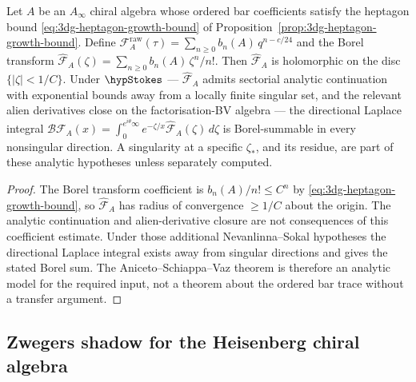 \begin{theorem}
\label{thm:3dg-borel-summability-chain-level}
%
%
Let $A$ be an $A_{\infty}$ chiral algebra whose ordered bar
coefficients satisfy the heptagon bound
\eqref{eq:3dg-heptagon-growth-bound} of
Proposition~\ref{prop:3dg-heptagon-growth-bound}. Define
$\mathcal F^{\mathrm{raw}}_{A}(\tau)
= \sum_{n \ge 0} b_{n}(A)\, q^{n - c/24}$ and the Borel transform
$\widehat{\mathcal F}_{A}(\zeta)
= \sum_{n \ge 0} b_{n}(A)\,\zeta^{n}/n!$.
Then $\widehat{\mathcal F}_{A}$ is holomorphic on the disc
$\{|\zeta| < 1/C\}$. Under $\hypStokes$ — $\widehat{\mathcal F}_{A}$
admits sectorial analytic continuation with exponential bounds away
from a locally finite singular set, and the relevant alien derivatives
close on the factorisation-BV algebra — the directional Laplace
integral
$\mathcal B\mathcal F_{A}(x)
= \int_{0}^{e^{i\theta}\infty} e^{-\zeta/x}\widehat{\mathcal F}_{A}(\zeta)\,d\zeta$
is Borel-summable in every nonsingular direction. A singularity at a
specific $\zeta_{\ast}$, and its residue, are part of these analytic
hypotheses unless separately computed.
\end{theorem}

\begin{proof}
The Borel transform coefficient is $b_{n}(A)/n! \le C^{n}$ by
\eqref{eq:3dg-heptagon-growth-bound}, so $\widehat{\mathcal F}_{A}$
has radius of convergence $\ge 1/C$ about the origin. The analytic
continuation and alien-derivative closure are not consequences of
this coefficient estimate. Under those additional Nevanlinna--Sokal
hypotheses the directional Laplace integral exists away from singular
directions and gives the stated Borel sum. The
Aniceto--Schiappa--Vaz theorem \cite[Thm.~3.1]{AnicetoSchiappa2015}
is therefore an analytic model for the required input, not a theorem
about the ordered bar trace without a transfer argument.
\end{proof}

\subsection{Zwegers shadow for the Heisenberg chiral algebra}
\label{subsec:3dg-zwegers-heisenberg}
%

